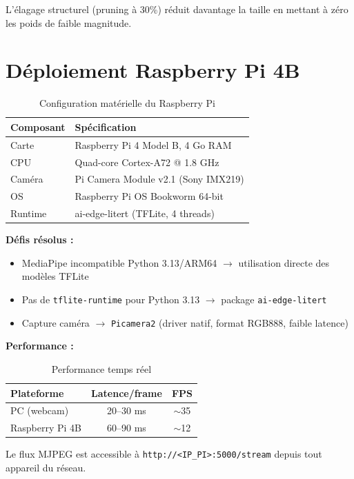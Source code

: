 \documentclass[11pt,a4paper]{article}
\begin{document}
L'élagage structurel (pruning à 30\%) réduit davantage la taille en mettant à zéro les poids de faible magnitude.

\section{Déploiement Raspberry Pi 4B}

\begin{table}[H]
\centering\small
\begin{tabular}{ll}
\toprule
\textbf{Composant} & \textbf{Spécification} \\
\midrule
Carte & Raspberry Pi 4 Model B, 4 Go RAM \\
CPU & Quad-core Cortex-A72 @ 1.8 GHz \\
Caméra & Pi Camera Module v2.1 (Sony IMX219) \\
OS & Raspberry Pi OS Bookworm 64-bit \\
Runtime & ai-edge-litert (TFLite, 4 threads) \\
\bottomrule
\end{tabular}
\caption{Configuration matérielle du Raspberry Pi}
\end{table}

\textbf{Défis résolus :}
\begin{itemize}\setlength\itemsep{0pt}
    \item MediaPipe incompatible Python 3.13/ARM64 $\rightarrow$ utilisation directe des modèles TFLite
    \item Pas de \texttt{tflite-runtime} pour Python 3.13 $\rightarrow$ package \texttt{ai-edge-litert}
    \item Capture caméra $\rightarrow$ \texttt{Picamera2} (driver natif, format RGB888, faible latence)
\end{itemize}

\textbf{Performance :}
\begin{table}[H]
\centering\small
\begin{tabular}{lcc}
\toprule
\textbf{Plateforme} & \textbf{Latence/frame} & \textbf{FPS} \\
\midrule
PC (webcam) & 20--30 ms & $\sim$35 \\
Raspberry Pi 4B & 60--90 ms & $\sim$12 \\
\bottomrule
\end{tabular}
\caption{Performance temps réel}
\end{table}

Le flux MJPEG est accessible à \texttt{http://<IP\_PI>:5000/stream} depuis tout appareil du réseau.
\end{document}
